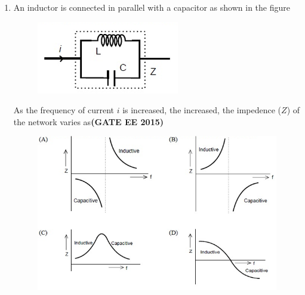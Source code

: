 \documentclass[a4paper,12pt]{exam}
\theoremstyle{remark}
\begin{document}
\begin{enumerate}
\begin{figure}[H]
    \caption{}
    \label{fig:placeholder}
\end{figure}
\item An inductor is connected in parallel with a capacitor as shown in the figure
\begin{figure}[H]
    \centering
    \includegraphics[width=0.5\columnwidth]{figs/Q 30.png}
    \caption{}
    \label{fig:placeholder}
\end{figure}
As the frequency of current $i$ is increased, the increased, the impedence ($Z$) of the network varies as\hfill{\textbf{(GATE EE 2015)}}
\begin{figure}[H]
    \centering
    \includegraphics[width=0.9\columnwidth]{figs/Q 30 opt.png}
\end{figure}


\end{enumerate}
\end{document}
